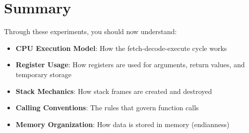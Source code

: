 \section{Summary}

Through these experiments, you should now understand:

\begin{itemize}
\item \textbf{CPU Execution Model}: How the fetch-decode-execute cycle works
\item \textbf{Register Usage}: How registers are used for arguments, return values, and temporary storage
\item \textbf{Stack Mechanics}: How stack frames are created and destroyed
\item \textbf{Calling Conventions}: The rules that govern function calls
\item \textbf{Memory Organization}: How data is stored in memory (endianness)
\end{itemize}
